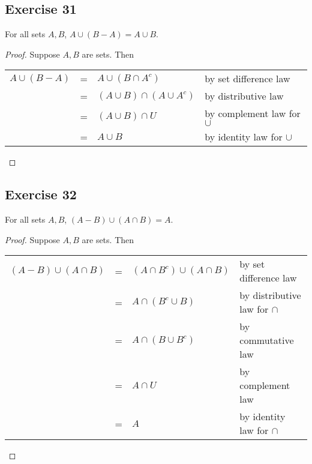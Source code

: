 \documentclass[14pt]{extarticle}
\newcommand{\cy}{\color{cyan}}
\begin{document}
\subsection{Exercise 31}
For all sets $A, B$, \(A \cup (B - A) = A \cup B\).

\begin{proof}
  Suppose $A,B$ are sets. Then
  \begin{center}
    \begin{tabular}{rcll}
      \(A \cup (B - A)\) & = & \(A \cup (B \cap A^c)\)          & {\cy by set difference law}        \\
      \(\)               & = & \((A \cup B) \cap (A \cup A^c)\) & {\cy by distributive law}          \\
      \(\)               & = & \((A \cup B) \cap U\)            & {\cy by complement law for $\cup$} \\
      \(\)               & = & \(A \cup B\)                     & {\cy by identity law for $\cup$}
    \end{tabular}
  \end{center}
\end{proof}

\subsection{Exercise 32}
For all sets $A, B$, \((A - B) \cup (A \cap B) = A\).

\begin{proof}
  Suppose $A,B$ are sets. Then
  \begin{center}
    \begin{tabular}{rcll}
      \((A - B) \cup (A \cap B)\) & = & \((A \cap B^c) \cup (A \cap B)\) & {\cy by set difference law}          \\
      \(\)                        & = & \(A \cap (B^c \cup B)\)          & {\cy by distributive law for $\cap$} \\
      \(\)                        & = & \(A \cap (B \cup B^c)\)          & {\cy by commutative law}             \\
      \(\)                        & = & \(A \cap U\)                     & {\cy by complement law}              \\
      \(\)                        & = & \(A\)                            & {\cy by identity law for $\cap$}
    \end{tabular}
  \end{center}
\end{proof}
\end{document}
